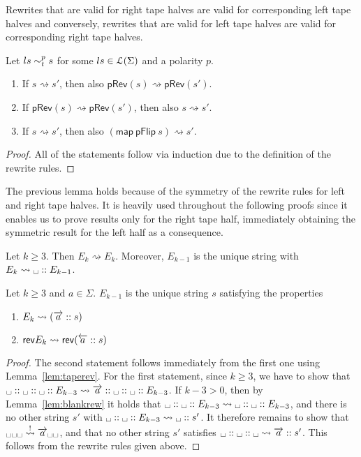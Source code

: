 \documentclass[a4paper,UKenglish,cleveref, autoref]{lipics-v2019}
\newcommand{\strent}{\rightsquigarrow}
\newcommand{\constrent}{\overset{!}{\rightsquigarrow}}
\begin{document}
\newcommand*{\pRev}[1]{\textsf{pRev}(#1)}

\begin{lemma}\label{lem:taperev}
  Rewrites that are valid for right tape halves are valid for corresponding left tape halves and conversely, rewrites that are valid for left tape halves are valid for corresponding right tape halves.

  Let $ls \sim_t^{p} s$ for some $ls \in \mathcal{L} (\Sigma)$ and a polarity $p$.
  \begin{enumerate}
    \item If $s \strent{} s'$, then also $\pRev{s} \strent{} \pRev{s'}$. 
    \item If $\pRev{s} \strent{} \pRev{s'}$, then also $s \strent{} s'$. 
    \item If $s \strent{} s'$, then also $(\textsf{map}~\textsf{pFlip}~s) \strent{} s'$. 
  \end{enumerate}
\end{lemma}
\begin{proof}
  All of the statements follow via induction due to the definition of the rewrite rules.
\end{proof}

The previous lemma holds because of the symmetry of the rewrite rules for left and right tape halves. It is heavily used throughout the following proofs since it enables us to prove results only for the right tape half, immediately obtaining the symmetric result for the left half as a consequence.

\begin{lemma}\label{lem:blankrew}
  Let $k \ge 3$. Then $E_k \strent{} E_k$. Moreover, $E_{k-1}$ is the unique string with $E_k \strent{} \blank :: E_{k-1}$. 
\end{lemma}

\begin{lemma}\label{lem:blankshiftin}
  Let $k \ge 3$ and $a \in \Sigma$. 
  $E_{k-1}$ is the unique string $s$ satisfying the properties
  \begin{enumerate}
    \item $E_k \strent{} (\polpos{a} :: s)$
    \item $\rev{E_k} \strent{} \rev{(\polneg{a} :: s)}$
  \end{enumerate}
\end{lemma}
\begin{proof}
  The second statement follows immediately from the first one using Lemma~\ref{lem:taperev}.
  For the first statement, since $k \ge 3$, we have to show that $\blank :: \blank :: \blank :: E_{k-3} \strent{} \polpos{a} :: \blank :: \blank :: E_{k-3}$. 
  If $k -3 > 0$, then by Lemma~\ref{lem:blankrew} it holds that $\blank :: \blank :: E_{k-3} \strent{} \blank :: \blank :: E_{k-3}$, and there is no other string $s'$ with $\blank :: \blank :: E_{k-3} \strent{} \blank :: s'$. 
  It therefore remains to show that $\blank\blank\blank \constrent{} \polpos{a}\blank\blank$, and that no other string $s'$ satisfies $\blank :: \blank :: \blank \strent{} \polpos{a} :: s'$. This follows from the rewrite rules given above. 
\end{proof}
\end{document}
